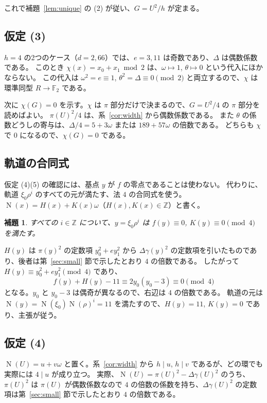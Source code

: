 \documentclass[a4paper,11pt]{ltjsarticle}
\makeatletter
\theoremstyle{jplain}
\newtheorem{lemma}[theorem]{補題}
\renewcommand{\proofname}{証明}
\renewenvironment{proof}[1][\proofname]{\par\pushQED{\qed}\normalfont\topsep6\p@\@plus6\p@\relax
  \trivlist\item[\hskip\labelsep\bfseries #1]\ignorespaces}{\popQED\endtrivlist\@endpefalse}
\numberwithin{equation}{section}
\numberwithin{table}{section}
\newcommand{\Z}{\mathbb{Z}}
\newcommand{\F}{\mathbb{F}}
\newcommand{\Nm}{\operatorname{N}}
\makeatother
\begin{document}
これで補題~\ref{lem:unique} の (2) が従い、$G=U^2/h$ が定まる。

\subsection{仮定 (3)}\label{sec:hyp3}

$h=4$ の2つのケース（$d=2,66$）では、$e=3,11$ は奇数であり、$\Delta$ は偶数係数である。
このとき $\chi(x)=x_0+x_1\bmod2$ は、$\omega\mapsto1$, $\theta\mapsto0$ という代入にほかならない。
この代入は $\omega^2=e\equiv1$, $\theta^2=\Delta\equiv0\pmod2$ と両立するので、$\chi$ は環準同型 $R\to\F_2$ である。

次に $\chi(G)=0$ を示す。$\chi$ は $\pi$ 部分だけで決まるので、$G=U^2/4$ の $\pi$ 部分を読めばよい。
$\pi(U)^2/4$ は、系~\ref{cor:width} から偶数係数である。
また $\theta$ の係数どうしの寄与は、$\Delta/4=5+3\omega$ または $189+57\omega$ の倍数である。
どちらも $\chi$ で $0$ になるので、$\chi(G)=0$ である。

\subsection{軌道の合同式}

仮定 (4)(5) の確認には、基点 $y$ が $f$ の零点であることは使わない。
代わりに、軌道 $\xi_0\rho^i$ のすべての元が満たす、法 $4$ の合同式を使う。
$\Nm(x)=H(x)+K(x)\omega$（$H(x),K(x)\in\Z$）と書く。

\begin{lemma}\label{lem:orbit4}
すべての $i\in\Z$ について、$y=\xi_0\rho^i$ は $f(y)\equiv0$, $K(y)\equiv0\pmod4$ を満たす。
\end{lemma}

\begin{proof}
$H(y)$ は $\pi(y)^2$ の定数項 $y_0^2+ey_1^2$ から $\Delta\gamma(y)^2$ の定数項を引いたものであり、後者は第~\ref{sec:small} 節で示したとおり $4$ の倍数である。
したがって $H(y)\equiv y_0^2+ey_1^2\pmod4$ であり、
\[
f(y)+H(y)-11\equiv2y_0(y_0-3)\equiv0\pmod4
\]
となる。$y_0$ と $y_0-3$ は偶奇が異なるので、右辺は $4$ の倍数である。
軌道の元は $\Nm(y)=\Nm(\xi_0)\Nm(\rho)^i=11$ を満たすので、$H(y)=11$, $K(y)=0$ であり、主張が従う。
\end{proof}

\subsection{仮定 (4)}\label{sec:hyp4}

$\Nm(U)=u+v\omega$ と置く。系~\ref{cor:width} から $h\mid u$, $h\mid v$ であるが、どの環でも実際には $4\mid u$ が成り立つ。
実際、$\Nm(U)=\pi(U)^2-\Delta\gamma(U)^2$ のうち、$\pi(U)^2$ は $\pi(U)$ が偶数係数なので $4$ の倍数の係数を持ち、$\Delta\gamma(U)^2$ の定数項は第~\ref{sec:small} 節で示したとおり $4$ の倍数である。
\end{document}
